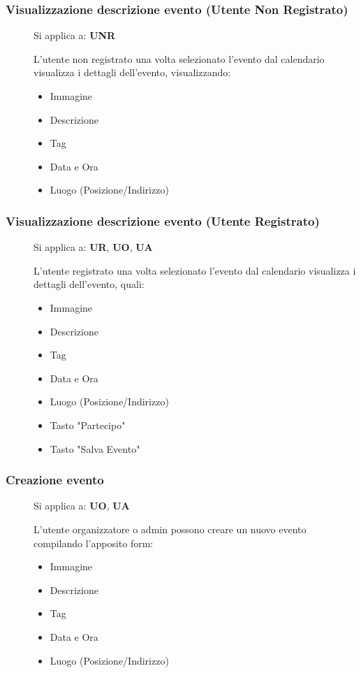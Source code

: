 \documentclass{article}
\begin{document}
\subsubsection{Visualizzazione descrizione evento (Utente Non Registrato)} \label{rf_3}
\begin{description}
    \item[] Si applica a: \textbf{UNR}
    \item[] L'utente non registrato una volta selezionato l'evento dal calendario visualizza i dettagli dell'evento, visualizzando:
        \begin{itemize}
            \item Immagine
            \item Descrizione
            \item Tag
            \item Data e Ora
            \item Luogo (Posizione/Indirizzo)
        \end{itemize}
\end{description}
\subsubsection{Visualizzazione descrizione evento (Utente Registrato)} \label{rf_4}
\begin{description}
    \item[] Si applica a: \textbf{UR}, \textbf{UO}, \textbf{UA}
    \item[] L'utente registrato una volta selezionato l'evento dal calendario visualizza i dettagli dell'evento, quali:
        \begin{itemize}
            \item Immagine
            \item Descrizione
            \item Tag
            \item Data e Ora
            \item Luogo (Posizione/Indirizzo)
            \item Tasto "Partecipo"
            \item Tasto "Salva Evento"
        \end{itemize}
\end{description}
\subsubsection{Creazione evento} \label{rf_5}
\begin{description}
    \item[] Si applica a: \textbf{UO}, \textbf{UA}
    \item[] L'utente organizzatore o admin possono creare un nuovo evento compilando l'apposito form:
        \begin{itemize}
            \item Immagine
            \item Descrizione
            \item Tag
            \item Data e Ora
            \item Luogo (Posizione/Indirizzo)
        \end{itemize}
\end{description}
\end{document}
